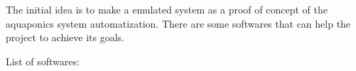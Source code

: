 The initial idea is to make a emulated system as a proof of concept of the aquaponics system automatization.
There are some softwares that can help the project to achieve its goals.

List of softwares:

